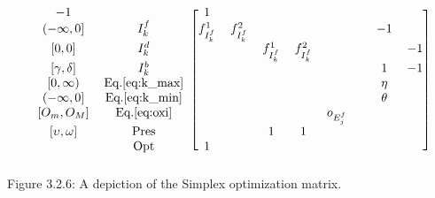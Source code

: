 \begin{equation*}
\begin{blockarray}{cccccccccc}
\begin{block}{cc[cccccccc]}
            -1                 &                   & 1                 &
             \\
            {(-\infty,0]}      & I_{k}^{f}         & f_{I_{k}^{f}}^{1} &
            f_{I_{k}^{f}}^{2}  &                   &                   &
                               &                   & -1                &
             \\
            {[0,0]}            & I_{k}^{d}         &                   &
                               & f_{I_{k}^{f}}^{1} & f_{I_{k}^{f}}^{2} &
                               &                   &                   &
            -1 \\
            {[\gamma, \delta]}
                               & I_{k}^{b}         &                   &
                               &                   &                   &
                               &                   & 1                 &
            -1 \\ 
            {[0, \infty)}      & \text{Eq.}\ref{eq:k_max}&             &
                               &                   &                   &
                               &                   & \eta             &
             \\
            {(-\infty, 0]}     & \text{Eq.}\ref{eq:k_min} &            &
                               &                   &                   &
                               &                   & \theta            & 
             \\
            {[O_{m},O_{M}]}    & \text{Eq.}\ref{eq:oxi} &              &
                               &                   &                   &
             o_{E_{j}^{f}}     &                   &                   &
             \\
            {[\upsilon,\omega]} & \text{Pres}      &                   &
                               & 1                 & 1                 &
                               &                   &                   &
             \\
                               & \text{Opt}        & 1                 &
                               &                   &                   &
                               &                   &                   &
             \\
            \end{block}
        \end{blockarray}
    \end{equation*}
    Figure 3.2.6: A depiction of the Simplex optimization matrix.


